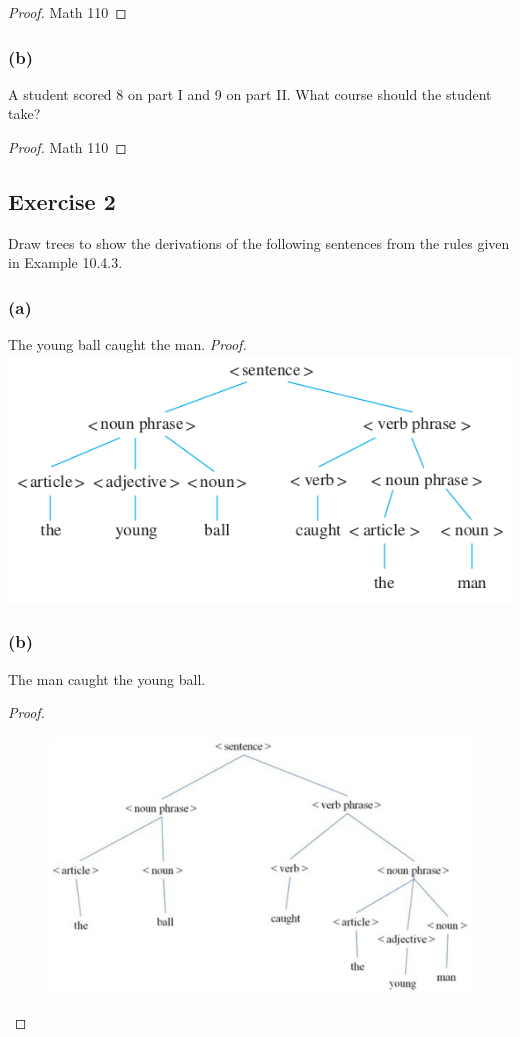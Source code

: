 \documentclass[14pt]{extarticle}
\begin{document}
\begin{proof}
Math 110
\end{proof}

\subsubsection{(b)}
A student scored 8 on part I and 9 on part II. What course should the student take?

\begin{proof}
Math 110
\end{proof}

\subsection{Exercise 2}
Draw trees to show the derivations of the following sentences from the rules given in Example 10.4.3.

\subsubsection{(a)}
The young ball caught the man. {\it Proof.} \includegraphics[scale=0.45]{../images/10.4.2.a.png}

\subsubsection{(b)}
The man caught the young ball.
\begin{proof}
\begin{figure}[ht!]
\centering
\includegraphics[scale=0.28]{../images/10.4.2.b.png}
\end{figure}
\end{proof}
\end{document}
